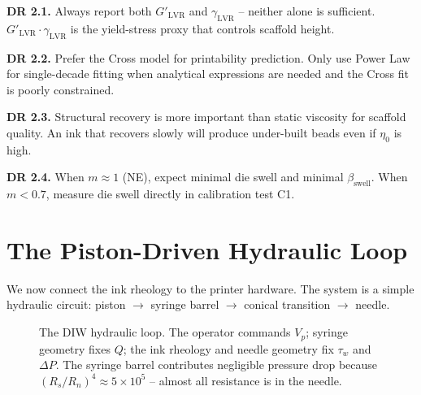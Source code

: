 \documentclass[11pt,a4paper]{article}
\begin{document}
\begin{designrulebox}
\textbf{DR 2.1.} Always report both $G'_\mathrm{LVR}$ and
$\gamma_\mathrm{LVR}$ -- neither alone is sufficient.
$G'_\mathrm{LVR}\cdot\gamma_\mathrm{LVR}$ is the yield-stress proxy
that controls scaffold height.

\textbf{DR 2.2.} Prefer the Cross model for printability prediction.
Only use Power Law for single-decade fitting when analytical expressions
are needed and the Cross fit is poorly constrained.

\textbf{DR 2.3.} Structural recovery is more important than static
viscosity for scaffold quality. An ink that recovers slowly will
produce under-built beads even if $\eta_0$ is high.

\textbf{DR 2.4.} When $m\approx 1$ (NE), expect minimal die swell
and minimal $\beta_\mathrm{swell}$. When $m<0.7$, measure die swell
directly in calibration test C1.
\end{designrulebox}

\section{The Piston-Driven Hydraulic Loop}
\label{sec:hydraulic_loop}

We now connect the ink rheology to the printer hardware. The system is a
simple hydraulic circuit: piston $\to$ syringe barrel $\to$ conical
transition $\to$ needle.

\begin{figure}[h]
\centering
{}
\caption{The DIW hydraulic loop. The operator commands $V_p$; syringe
geometry fixes $Q$; the ink rheology and needle geometry fix $\tau_w$
and $\Delta P$. The syringe barrel contributes negligible pressure drop
because $(R_s/R_n)^4\approx 5\times 10^5$ -- almost all resistance is
in the needle.}
\label{fig:loop}
\end{figure}
\end{document}
